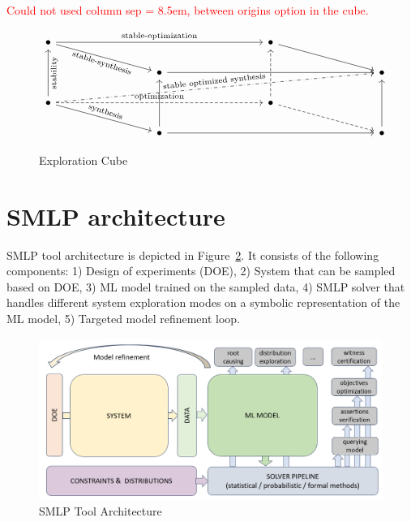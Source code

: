 \documentclass[a4paper,parskip=half]{article} %
\newcommand\removed[1]{}
\newcommand\added[1]{#1}
\newcommand\changedto[2]{%
    \removed{#1}%
    \added{#2}}
\newcommand\todozk[1]{\textcolor{red}{#1}}
\newcommand*\ZK{\todozk}
\begin{document}
\ZK{Could not used column sep = {8.5em, between origins} option in the cube.}
\begin{figure}[hb!] %
\centering
\[
    \begin{tikzcd}[row sep=1.5em, column sep = {8.5em}, my label/.style={midway, sloped}]
    \bullet
    \arrow[rr, "\text{stable-optimization}"]
    \arrow[dr, swap,"\text{stable-synthesis}"{anchor=north,rotate=-18}]
    &&
    \bullet
    \arrow[dr]
    \\
    &
    \bullet
    \arrow[rr]
    &&
    \bullet
    \\
    \bullet
    \arrow[uu, "\text{stability}"{anchor=north,rotate=90}] 
    \arrow[rr, dashed, "\text{optimization}"] 
    \arrow[dr, swap, "\text{synthesis}"{anchor=south, rotate=-18}] 
    \arrow[rrru, dashdotted, "\text{stable optimized synthesis}"{anchor=south, rotate=6}]
    &&
    \bullet  
    \arrow[dr, dashed] 
    \arrow[uu, dashed]
    \\
    &
    \bullet
    \arrow[rr] 
    \arrow[uu]
    && 
    \bullet
    \arrow[uu]
    \end{tikzcd}
\]
\caption{Exploration Cube}
\label{fig:cube}
\end{figure}



\section{SMLP architecture}

SMLP tool architecture is depicted in Figure~\ref{smlp_system}. 
It consists of the following components: 1) Design of experiments (DOE),
2) System that can be \changedto{simulated}{sampled} based on DOE, 3)  
ML model trained on the \changedto{simulated}{sampled} data, 4) SMLP solver that handles different system 
exploration modes on a symbolic representation of the ML model, 5) Targeted model refinement loop.

\begin{figure}[tp]
\center
\includegraphics[width= 0.7\columnwidth]{smlp_system.PNG}
\caption{SMLP Tool Architecture} \label{smlp_system}
\end{figure}
\end{document}
